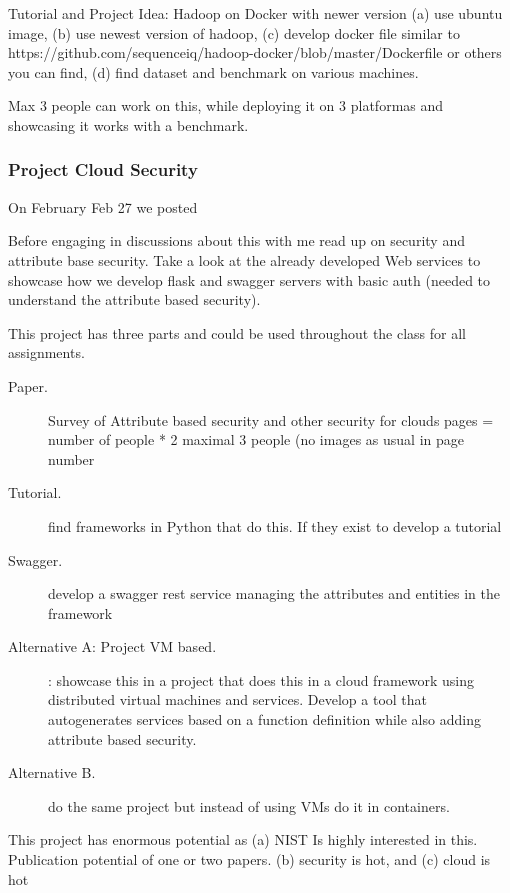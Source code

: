 Tutorial and Project Idea: Hadoop on Docker with newer version
(a) use ubuntu image, (b) use newest version of hadoop, (c) develop
docker file similar to
https://github.com/sequenceiq/hadoop-docker/blob/master/Dockerfile or
others you can find, (d) find dataset and benchmark on various machines.

Max 3 people can work on this, while deploying it on 3 platformas and
showcasing it works with a benchmark.
 

\subsubsection{Project Cloud Security}

On February Feb 27 we posted

Before engaging in discussions about this with me read
up on security and attribute base security. Take a look at the already
developed Web services to showcase how we develop flask and swagger
servers with basic auth (needed to understand the attribute based
security).
 

This project has three parts and could be used throughout the class
for all assignments.

\begin{description} 

\item[Paper.] Survey of Attribute based security and other  security for clouds pages = number of people * 2  maximal 3 people (no images as usual in page number
 
\item [Tutorial.] find frameworks in Python that do this. If they
  exist to develop a tutorial
 
\item[Swagger.] develop a swagger rest service managing the attributes
  and entities in the framework
 
\item[Alternative A: Project VM based.]: showcase this in a project
  that does this in a cloud framework using distributed virtual
  machines and services. Develop a tool that autogenerates services
  based on a function definition while also adding attribute based
  security.
 
\item[Alternative B.] do the same project but instead of using VMs do it in containers.
 
\end{description}

This project has enormous potential as (a) NIST Is highly interested
in this. Publication potential of one or two papers. (b) security is
hot, and (c) cloud is hot
 


